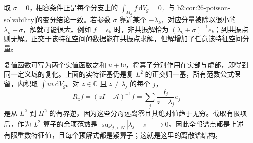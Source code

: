 取 \(\sigma=0\)，相容条件正是每个分支上的 \(\int_{M_a}f\,\mathrm dV_g=0\)，与\cref{b2:cor:26-poisson-solvability}的变分结论一致。若参数 \(\sigma\) 靠近某个 \(-\lambda_k\)，对应分量被除以很小的 \(\lambda_k+\sigma\)，解就可能很大。例如 \(f=e_k\) 时，非共振解恰为 \((\lambda_k+\sigma)^{-1}e_k\)；到共振点则无解。正交于该特征空间的数据能在共振点求解，但解增加了任意该特征空间分量。

\ProseParagraphBreak

复值函数可写为两个实值函数之和 \(u+\mathrm iv\)，将算子分别作用在实部与虚部，即得到同一定义域的复化。上面的实特征基仍是复 \(L^2\) 的正交归一基，所有范数公式保留，内积取 \(\int u\overline v\,\mathrm dV_g\)。对 \(z\in\mathbb C\) 且 \(z\ne\lambda_j\) 的每个 \(j\)，
\[
 R_zf=(zI-\mathcal A)^{-1}f=\sum_j\frac{f_j}{z-\lambda_j}e_j
\]
是从 \(L^2\) 到 \(H^2\) 的有界逆，因为这些分母远离零且其绝对值趋于无穷。截取有限项后，作为 \(L^2\) 算子的余项范数是 \(\sup_{j>N}|\lambda_j-z|^{-1}\to0\)。因此全部谱点都是上述有限重数特征值，且每个预解式都是紧算子；这就是这里的离散谱结构。
